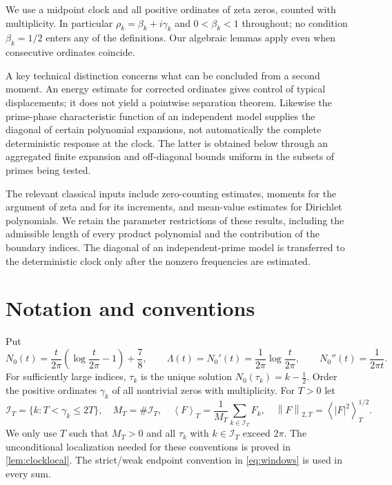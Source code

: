 \documentclass[11pt,reqno]{amsart}
\numberwithin{equation}{section}
\newcommand{\av}[1]{\left\langle #1\right\rangle_T}
\newcommand{\norm}[1]{\left\|#1\right\|_{2,T}}
\newcommand{\calI}{\mathcal I_T}
\newcommand{\lamb}{\Lambda}
\begin{document}
We use a midpoint clock and all positive ordinates of zeta zeros, counted with multiplicity. In particular $\rho_k=\beta_k+i\gamma_k$ and $0<\beta_k<1$ throughout; no condition $\beta_k=1/2$ enters any of the definitions. Our algebraic lemmas apply even when consecutive ordinates coincide.

A key technical distinction concerns what can be concluded from a second moment. An energy estimate for corrected ordinates gives control of typical displacements; it does not yield a pointwise separation theorem. Likewise the prime-phase characteristic function of an independent model supplies the diagonal of certain polynomial expansions, not automatically the complete deterministic response at the clock. The latter is obtained below through an aggregated finite expansion and off-diagonal bounds uniform in the subsets of primes being tested.

The relevant classical inputs include zero-counting estimates, moments for the argument of zeta and for its increments, and mean-value estimates for Dirichlet polynomials. We retain the parameter restrictions of these results, including the admissible length of every product polynomial and the contribution of the boundary indices. The diagonal of an independent-prime model is transferred to the deterministic clock only after the nonzero frequencies are estimated.


\section{Notation and conventions}\label{sec:notation}
Put
\begin{equation}\label{eq:N0}
N_0(t)=\frac{t}{2\pi}\left(\log\frac{t}{2\pi}-1\right)+\frac78,
\qquad \lamb(t)=N_0'(t)=\frac1{2\pi}\log\frac{t}{2\pi},\qquad
N_0''(t)=\frac1{2\pi t}.
\end{equation}
For sufficiently large indices, $\tau_k$ is the unique solution $N_0(\tau_k)=k-\tfrac12$. Order the positive ordinates $\gamma_k$ of all nontrivial zeros with multiplicity. For $T>0$ let
\begin{equation}\label{eq:windows}
\calI=\{k:T<\gamma_k\le 2T\},\quad M_T=\#\calI,
\quad\av{F}=\frac1{M_T}\sum_{k\in\calI}F_k,\quad \norm{F}=\av{|F|^2}^{1/2}.
\end{equation}
We only use $T$ such that $M_T>0$ and all $\tau_k$ with $k\in\calI$ exceed $2\pi$.  The unconditional localization needed for these conventions is proved in \cref{lem:clocklocal}. The strict/weak endpoint convention in \eqref{eq:windows} is used in every sum.
\end{document}
